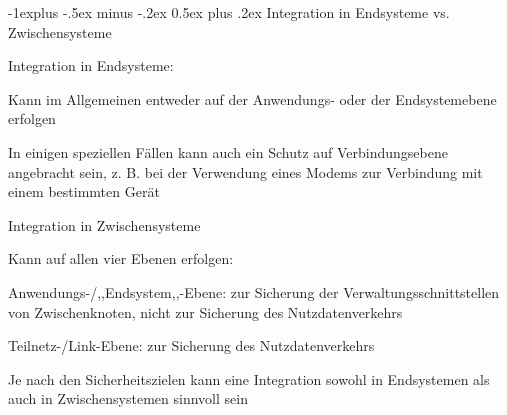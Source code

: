 \documentclass[a4paper]{article}
\makeatletter
\renewcommand{\subsection}{\@startsection{subsection}{2}{0mm}%
 {-1explus -.5ex minus -.2ex}%
 {0.5ex plus .2ex}%
 {\normalfont\normalsize\bfseries}}
\makeatother
\begin{document}
\begin{multicols}{3}
      \subsection{Integration in Endsysteme vs. Zwischensysteme}
      \begin{itemize*}
            \item Integration in Endsysteme:
            \begin{itemize*}
                  \item Kann im Allgemeinen entweder auf der Anwendungs- oder der Endsystemebene erfolgen
                  \item In einigen speziellen Fällen kann auch ein Schutz auf Verbindungsebene angebracht sein, z. B. bei der Verwendung eines Modems zur Verbindung mit einem bestimmten Gerät
            \end{itemize*}
            \item Integration in Zwischensysteme
            \begin{itemize*}
                  \item Kann auf allen vier Ebenen erfolgen:
                  \begin{itemize*}
                        \item Anwendungs-/,,Endsystem,,-Ebene: zur Sicherung der Verwaltungsschnittstellen von Zwischenknoten, nicht zur Sicherung des Nutzdatenverkehrs
                        \item Teilnetz-/Link-Ebene: zur Sicherung des Nutzdatenverkehrs
                  \end{itemize*}
            \end{itemize*}
            \item Je nach den Sicherheitszielen kann eine Integration sowohl in Endsystemen als auch in Zwischensystemen sinnvoll sein
      \end{itemize*}




\end{multicols}
\end{document}
